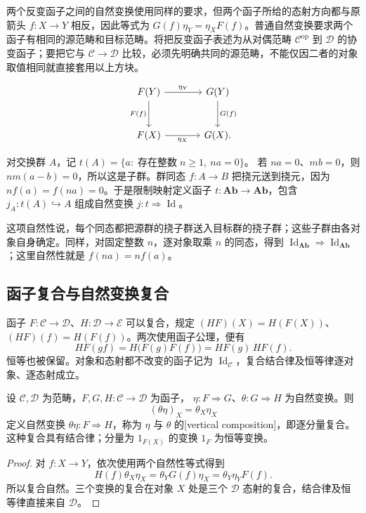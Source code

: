 \ProseParagraphBreak
两个反变函子之间的自然变换使用同样的要求，但两个函子所给的态射方向都与原箭头 \(f:X\rightarrow Y\) 相反，因此等式为 \(G(f)\eta_Y=\eta_XF(f)\)。普通自然变换要求两个函子有相同的源范畴和目标范畴。将把反变函子表述为从对偶范畴 \(\mathcal C^{\mathrm{op}}\) 到 \(\mathcal D\) 的协变函子；要把它与 \(\mathcal C\rightarrow\mathcal D\) 比较，必须先明确共同的源范畴，不能仅因二者的对象取值相同就直接套用以上方块。

\[
	\begin{tikzcd}[column sep=large,row sep=large]
		F(Y)\arrow[r,"\eta_Y"]\arrow[d,"F(f)"']& G(Y)\arrow[d,"G(f)"]\\
		F(X)\arrow[r,"\eta_X"']&G(X).
	\end{tikzcd}
\]

\begin{example}\label{b4:ex:torsion-natural-inclusion}
	对交换群 \(A\)，记 \(t(A)=\{a:\;\text{存在整数}\;n\ge1,\ na=0\}\)。 若 \(na=0\)、\(mb=0\)，则 \(nm(a-b)=0\)，所以这是子群。群同态 \(f:A\rightarrow B\) 把挠元送到挠元，因为 \(nf(a)=f(na)=0\)。于是限制映射定义函子 \(t:\mathbf{Ab}\rightarrow\mathbf{Ab}\)，包含 \(j_A:t(A)\hookrightarrow A\) 组成自然变换 \(j:t\Rightarrow\operatorname{Id}\)。
\end{example}

这项自然性说，每个同态都把源群的挠子群送入目标群的挠子群；这些子群由各对象自身确定。同样，对固定整数 \(n\)，逐对象取乘 \(n\) 的同态，得到 \(\operatorname{Id}_{\mathbf{Ab}}\Rightarrow\operatorname{Id}_{\mathbf{Ab}}\)；这里自然性就是 \(f(na)=nf(a)\)。

\subsection{函子复合与自然变换复合}
\label{b4:subsec:0102:02}

函子 \(F:\mathcal C\rightarrow\mathcal D\)、\(H:\mathcal D\rightarrow\mathcal E\) 可以复合，规定 \((HF)(X)=H(F(X))\)、\((HF)(f)=H(F(f))\)。两次使用函子公理，便有
\[
	HF(gf)=H\bigl(F(g)F(f)\bigr)=HF(g)\,HF(f).
\]
恒等也被保留。对象和态射都不改变的函子记为 \(\operatorname{Id}_{\mathcal C}\)，复合结合律及恒等律逐对象、逐态射成立。

\begin{proposition}\label{b4:prop:vertical-composition}
	设 \(\mathcal C,\mathcal D\) 为范畴，\(F,G,H:\mathcal C\rightarrow\mathcal D\) 为函子， \(\eta:F\Rightarrow G\)、\(\theta:G\Rightarrow H\) 为自然变换。则
	\[
		(\theta\eta)_X=\theta_X\eta_X
	\]
	定义自然变换 \(\theta\eta:F\Rightarrow H\)，称为 \(\eta\) 与 \(\theta\) 的[vertical composition]，即逐分量复合。这种复合具有结合律；分量为 \(1_{F(X)}\) 的变换 \(1_F\) 为恒等变换。
\end{proposition}
\begin{proof}
	对 \(f:X\rightarrow Y\)，依次使用两个自然性等式得到
	\[
		H(f)\theta_X\eta_X =\theta_YG(f)\eta_X =\theta_Y\eta_YF(f).
	\]
	所以复合自然。三个变换的复合在对象 \(X\) 处是三个 \(\mathcal D\) 态射的复合，结合律及恒等律直接来自 \(\mathcal D\)。
\end{proof}

